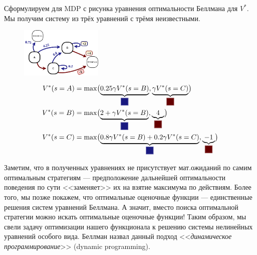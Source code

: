 \begin{example}
Сформулируем для MDP с рисунка уравнения оптимальности Беллмана для $V^*$. Мы получим систему из трёх уравнений с трёмя неизвестными.

\begin{figure}
\vspace{-0.2cm}
\centering
\includegraphics[width=0.35\textwidth]{Images/OptimalQ.png}
\vspace{-1.3cm}
\end{figure}

\begin{align*} 
V^*(s = A) &= \max \bigl( \underbrace{0.25 \gamma V^*(s = B)}_{\colorsquare{ChadBlue}}, \underbrace{\gamma V^*(s = C)}_{\colorsquare{ChadRed}} \bigr) \\ 
V^*(s = B) &= \max \bigl( \underbrace{2 + \gamma V^*(s = B)}_{\colorsquare{ChadBlue}}, \underbrace{4}_{\colorsquare{ChadRed}} \bigr) \\ 
V^*(s = C) &= \max \bigl( \underbrace{0.8 \gamma V^*(s = B) + 0.2 \gamma V^*(s = C)}_{\colorsquare{ChadBlue}}, \underbrace{-1}_{\colorsquare{ChadRed}} \bigr) \\ 
\end{align*}
\end{example}

Заметим, что в полученных уравнениях не присутствует мат.ожиданий по самим оптимальным стратегиям --- предположение дальнейшей оптимальности поведения по сути <<заменяет>> их на взятие максимума по действиям. Более того, мы позже покажем, что оптимальные оценочные функции --- единственные решения систем уравнений Беллмана. А значит, вместо поиска оптимальной стратегии можно искать оптимальные оценочные функции! Таким образом, мы свели задачу оптимизации нашего функционала к решению системы нелинейных уравнений особого вида. Беллман назвал данный подход <<\emph{динамическое программирование}>> (dynamic programming).


